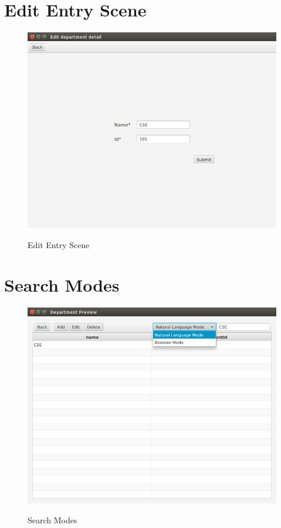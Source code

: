 \section{Edit Entry Scene}
\begin{figure}[H]
\caption{Edit Entry Scene}
\includegraphics[scale=0.6]{./edit_entry.png}
\label{fig:Edit Entry Scene}
\end{figure}

\section{Search Modes}
\begin{figure}[H]
\caption{Search Modes}
\includegraphics[scale=0.6]{./search_mode.png}
\label{fig:Search Modes}
\end{figure}